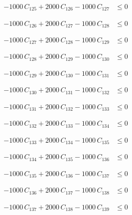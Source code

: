 \documentclass[a4paper,11pt]{article}
\begin{document}
\begin{align}
-1000\,C_{125} + 2000\,C_{126} - 1000\,C_{127} &\leq 0 \nonumber
\end{align}

\begin{align}
-1000\,C_{126} + 2000\,C_{127} - 1000\,C_{128} &\leq 0 \nonumber
\end{align}

\begin{align}
-1000\,C_{127} + 2000\,C_{128} - 1000\,C_{129} &\leq 0 \nonumber
\end{align}

\begin{align}
-1000\,C_{128} + 2000\,C_{129} - 1000\,C_{130} &\leq 0 \nonumber
\end{align}

\begin{align}
-1000\,C_{129} + 2000\,C_{130} - 1000\,C_{131} &\leq 0 \nonumber
\end{align}

\begin{align}
-1000\,C_{130} + 2000\,C_{131} - 1000\,C_{132} &\leq 0 \nonumber
\end{align}

\begin{align}
-1000\,C_{131} + 2000\,C_{132} - 1000\,C_{133} &\leq 0 \nonumber
\end{align}

\begin{align}
-1000\,C_{132} + 2000\,C_{133} - 1000\,C_{134} &\leq 0 \nonumber
\end{align}

\begin{align}
-1000\,C_{133} + 2000\,C_{134} - 1000\,C_{135} &\leq 0 \nonumber
\end{align}

\begin{align}
-1000\,C_{134} + 2000\,C_{135} - 1000\,C_{136} &\leq 0 \nonumber
\end{align}

\begin{align}
-1000\,C_{135} + 2000\,C_{136} - 1000\,C_{137} &\leq 0 \nonumber
\end{align}

\begin{align}
-1000\,C_{136} + 2000\,C_{137} - 1000\,C_{138} &\leq 0 \nonumber
\end{align}

\begin{align}
-1000\,C_{137} + 2000\,C_{138} - 1000\,C_{139} &\leq 0 \nonumber
\end{align}
\end{document}
